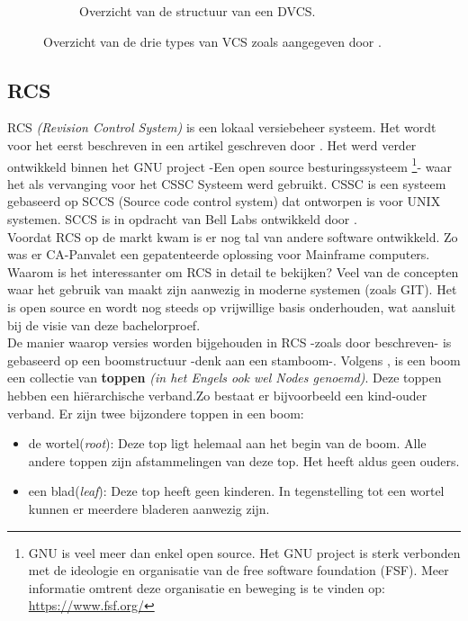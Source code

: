 \begin{figure}[h!]
\begin{subfigure}{.5\textwidth}
	\caption[Overzicht structuur DVCS]{Overzicht van de structuur van een DVCS.}
	\end{subfigure}
	
	\caption[Overzicht types VCS]{Overzicht van de drie types van VCS zoals aangegeven door \textcite{Chacon2014}.}\label{fig_types_cvs}
\end{figure}

	
\subsection{RCS}
\label{sec:RCS}


RCS \textit{(Revision Control System)} is een lokaal versiebeheer systeem. Het wordt voor het eerst beschreven in een artikel geschreven door \textcite{Tichy85rcs}. Het werd verder ontwikkeld binnen het GNU project -Een open source besturingssysteem \footnote{GNU is veel meer dan enkel open source. Het GNU project is sterk verbonden met de ideologie en organisatie van de free software foundation (FSF). Meer informatie omtrent deze organisatie en beweging is te vinden op: \url{https://www.fsf.org/}}- waar het als vervanging voor het CSSC Systeem \autocite{GNUCSSC} werd gebruikt. CSSC is een systeem gebaseerd op SCCS (Source code control system) dat ontworpen is voor UNIX systemen. SCCS is in opdracht van Bell Labs ontwikkeld door \textcite{Rochkind1975}.\\

Voordat RCS op de markt kwam is er nog tal van andere software ontwikkeld. Zo was er CA-Panvalet een gepatenteerde oplossing voor Mainframe computers.\\

Waarom is het interessanter om RCS in detail te bekijken? Veel van de concepten waar het gebruik van maakt zijn aanwezig in moderne systemen (zoals GIT). Het is open source en wordt nog steeds op vrijwillige basis onderhouden, wat aansluit bij de visie van deze bachelorproef.\\

De manier waarop versies worden bijgehouden in RCS -zoals door \textcite{Tichy85rcs} beschreven- is gebaseerd op een boomstructuur -denk aan een stamboom-. Volgens \textcite{Lievens2019}, is een boom een collectie van \textbf{toppen} \textit{(in het Engels ook wel Nodes genoemd)}. Deze toppen hebben een hiërarchische verband.Zo bestaat er bijvoorbeeld een kind-ouder verband. Er zijn twee bijzondere toppen in een boom:

\begin{itemize}
	\item de wortel(\textit{root}): Deze top ligt helemaal aan het begin van de boom. Alle andere toppen zijn afstammelingen van deze top. Het heeft aldus geen ouders.
	\item een blad(\textit{leaf}): Deze top heeft geen kinderen. In tegenstelling tot een wortel kunnen er meerdere bladeren aanwezig zijn.
\end{itemize}

